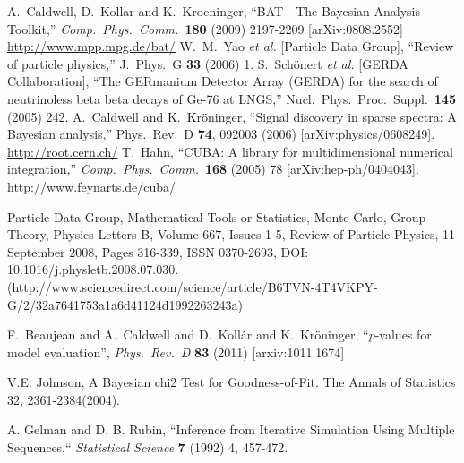 \documentclass[11pt, a4paper]{article}
\begin{document}



\begin{thebibliography}{99}
  A.~Caldwell, D.~Kollar and K.~Kroeninger, ``BAT - The Bayesian
  Analysis Toolkit,'' \textit{Comp.\ Phys.\ Comm.}\ {\bf 180} (2009) 2197-2209
  [arXiv:0808.2552]
  \url{http://www.mpp.mpg.de/bat/}
%
  W.~M.~Yao {\it et al.}  [Particle Data Group],
  ``Review of particle physics,''
  J.\ Phys.\ G {\bf 33} (2006) 1.
%
  S.~Sch{\"o}nert {\it et al.}  [GERDA Collaboration],
  ``The GERmanium Detector Array (GERDA) for the search of neutrinoless beta
  beta decays of Ge-76 at LNGS,''
  Nucl.\ Phys.\ Proc.\ Suppl.\  {\bf 145} (2005) 242.
%
  A.~Caldwell and K.~Kr{\"o}ninger,
  ``Signal discovery in sparse spectra: A Bayesian analysis,''
  Phys.\ Rev.\  D {\bf 74}, 092003 (2006)
  [arXiv:physics/0608249].
%
  \url{http://root.cern.ch/}
%
  T.~Hahn, ``CUBA: A library for multidimensional numerical
  integration,'' \textit{Comp.\ Phys.\ Comm.}\ {\bf 168} (2005) 78
  [arXiv:hep-ph/0404043].
%
  \url{http://www.feynarts.de/cuba/}

Particle Data Group, Mathematical Tools or Statistics, Monte Carlo, Group Theory, Physics Letters B, Volume 667, Issues 1-5, Review of Particle Physics, 11 September 2008, Pages 316-339, ISSN 0370-2693, DOI: 10.1016/j.physletb.2008.07.030.
(http://www.sciencedirect.com/science/article/B6TVN-4T4VKPY-G/2/32a7641753a1a6d41124d1992263243a)

F.~Beaujean and A.~Caldwell and D.~Koll{\'a}r and K.~Kr{\"o}ninger,
``$p$-values for model evaluation'', \textit{Phys.\ Rev.\ D} {\bf 83} (2011)
[arxiv:1011.1674]

V.E. Johnson,  A Bayesian chi2 Test for Goodness-of-Fit. The Annals of Statistics 32, 2361-2384(2004).

A. Gelman and D. B. Rubin, ``Inference from Iterative Simulation Using Multiple Sequences,`` \emph{Statistical Science}   {\bf 7} (1992) 4,  457-472.


\end{thebibliography}

\end{document}
